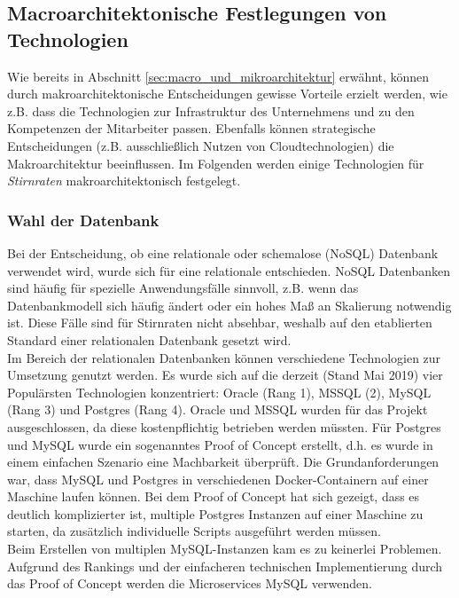 {\subsection{Macroarchitektonische Festlegungen von Technologien}
Wie bereits in Abschnitt \ref{sec:macro_und_mikroarchitektur} erwähnt, können durch makroarchitektonische Entscheidungen gewisse Vorteile erzielt werden, wie z.B. dass die Technologien zur Infrastruktur des Unternehmens und zu den Kompetenzen der Mitarbeiter passen. Ebenfalls können strategische Entscheidungen (z.B. ausschließlich Nutzen von Cloudtechnologien) die Makroarchitektur beeinflussen. Im Folgenden werden einige Technologien für \textit{Stirnraten} makroarchitektonisch festgelegt. 

\subsubsection{Wahl der Datenbank}
Bei der Entscheidung, ob eine relationale oder schemalose (NoSQL) Datenbank verwendet wird, wurde sich für eine relationale entschieden. NoSQL Datenbanken sind häufig für spezielle Anwendungsfälle sinnvoll, z.B. wenn das Datenbankmodell sich häufig ändert oder ein hohes Maß an Skalierung notwendig ist. Diese Fälle sind für Stirnraten nicht absehbar, weshalb auf den etablierten Standard einer relationalen Datenbank gesetzt wird.\cite{kloeckner2015nosql_vs_relationale_datenbank}\\

Im Bereich der relationalen Datenbanken können verschiedene Technologien zur Umsetzung genutzt werden. Es wurde sich auf die derzeit (Stand Mai 2019) vier Populärsten Technologien konzentriert: Oracle (Rang 1), MSSQL (2), MySQL (Rang 3) und Postgres (Rang 4).\cite{dbengines2019ranking}  Oracle und MSSQL wurden für das Projekt ausgeschlossen, da diese kostenpflichtig betrieben werden müssten. Für Postgres und MySQL wurde ein sogenanntes Proof of Concept erstellt, d.h. es wurde in einem einfachen Szenario eine Machbarkeit überprüft. Die Grundanforderungen war, dass MySQL und Postgres in verschiedenen Docker-Containern auf einer Maschine laufen können. Bei dem Proof of Concept hat sich gezeigt, dass es deutlich komplizierter ist, multiple Postgres Instanzen auf einer Maschine zu starten, da zusätzlich individuelle Scripts ausgeführt werden müssen.\cite{postgres2016}\\

Beim Erstellen von multiplen MySQL-Instanzen kam es zu keinerlei Problemen. Aufgrund des Rankings und der einfacheren technischen Implementierung durch das Proof of Concept werden die Microservices MySQL verwenden.

}
